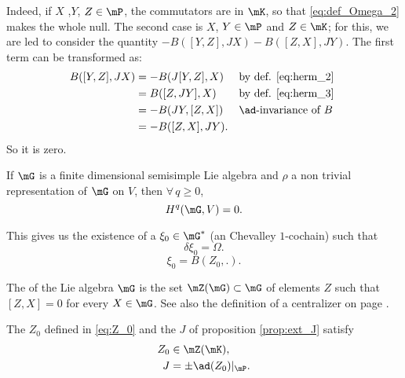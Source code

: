Indeed, if $X$ ,$Y$, $Z\in\mP$, the commutators are in $\mK$, so that \eqref{eq:def_Omega_2} makes the whole null. The second case is $X$, $Y\in\mP$ and $Z\in\mK$; for this, we are led to consider the quantity $-B( [Y,Z],JX )-B([Z,X],JY)$. The first term can be transformed as:
\[
\begin{aligned}
  B([Y,Z],JX)&=-B(J[Y,Z],X)&&\text{by def. \eqref{eq:herm_2} } \\
             &=B([Z,JY],X)&&\text{by def.  \eqref{eq:herm_3}}\\
	     &=-B(JY,[Z,X])&&\text{$\ad$-invariance of $B$}\\
	     &=-B([Z,X],JY).
\end{aligned}
\]
So it is zero.

\begin{lemma}
If $\mG$ is  a finite dimensional semisimple  Lie algebra and $\rho$ a non trivial representation of $\mG$ on $V$, then $\forall\,q\geq 0$,
\[
      H^q(\mG,V)=0.
\]
\end{lemma}

This gives us the existence of a $\xi_0\in\mG^*$ (an Chevalley $1$-cochain) such that 
\[
   \delta\xi_0=\Omega.
\]
\begin{equation}\label{eq:Z_0}
   \xi_0=B(Z_0,.).
\end{equation}

\begin{definition}
	The  of the Lie algebra $\mG$ is the set $\mZ(\mG)\subset\mG$ of elements $Z$ such that $[Z,X]=0$ for every $X\in\mG$. See also the definition of a centralizer on page \pageref{PgDefCentralisateur}.
\end{definition}

\begin{proposition}
The $Z_0$ defined in \eqref{eq:Z_0} and the $J$ of proposition \ref{prop:ext_J} satisfy
\begin{subequations}
\begin{align}
   Z_0&\in\mZ(\mK),\\
   J&=\pm\ad(Z_0)|_{\mP}.
\end{align}   
\end{subequations}


\end{proposition}

